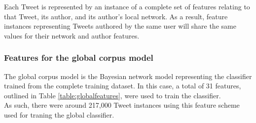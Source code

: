 Each Tweet is represented by an instance of a complete set of features relating to that Tweet, its author, and its author's local network. As a result, feature instances representing Tweets authored by the same user will share the same values for their network and author features.


\subsubsection{Features for the global corpus model}
The global corpus model is the Bayesian network model representing the classifier trained from the complete training dataset. In this case, a total of 31 features, outlined in Table \ref{table:globalfeatures}, were used to train the classifier.\\
As such, there were around 217,000 Tweet instances using this feature scheme used for traning the global classifier.

